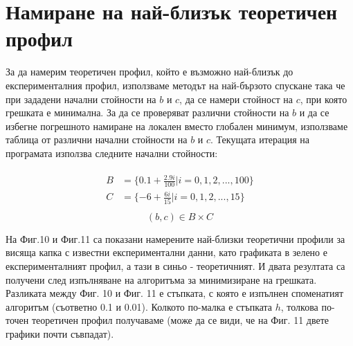 \documentclass{article}
\begin{document}
\section{Намиране на най-близък теоретичен профил}
За да намерим теоретичен профил, който е възможно най-близък до експерименталния профил, използваме методът на най-бързото спускане така че при зададени начални стойности на \(b\) и \(c\), да се намери стойност на \(c\), при която грешката е минимална. За да се проверяват различни стойности на \(b\) и да се избегне погрешното намиране на локален вместо глобален минимум, използваме таблица от различни начални стойности на $b$ и $c$. Текущата итерация на програмата използва следните начални стойности:

\begin{align*}
\begin{split} 
B &= \{0.1 + \frac{2.9i}{100} | i = 0, 1, 2, ..., 100\}\\
C &= \{-6 + \frac{6i}{15} | i = 0, 1, 2, ..., 15\}\\
\end{split}
\end{align*}
$$(b,c) \in B \times C $$

На Фиг.10 и Фиг.11 са показани намерените най-близки теоретични профили за висяща капка с известни експериментални данни, като графиката в зелено е експерименталният профил, а тази в синьо - теоретичният. И двата резултата са получени след изпълняване на алгоритъма за минимизиране на грешката. Разликата между Фиг. 10 и Фиг. 11 е стъпката, с която е изпълнен споменатият алгоритъм (съответно 0.1 и 0.01). Колкото по-малка е стъпката \(h\), толкова по-точен теоретичен профил получаваме (може да се види, че на Фиг. 11 двете графики почти съвпадат).
\end{document}
